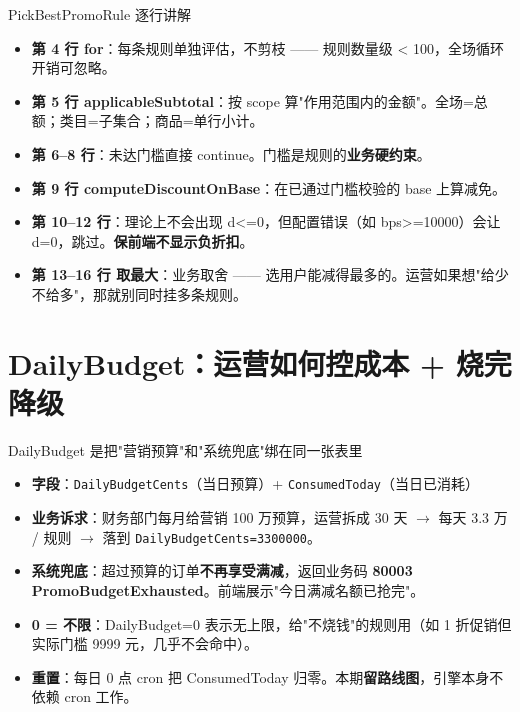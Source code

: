 \documentclass[aspectratio=169,11pt]{beamer}
\begin{document}
\begin{frame}[shrink]{PickBestPromoRule 逐行讲解}
\begin{itemize}
  \item \textbf{第 4 行 for}：每条规则单独评估，不剪枝 —— 规则数量级 < 100，全场循环开销可忽略。
  \item \textbf{第 5 行 applicableSubtotal}：按 scope 算"作用范围内的金额"。全场=总额；类目=子集合；商品=单行小计。
  \item \textbf{第 6--8 行}：未达门槛直接 continue。门槛是规则的\textbf{业务硬约束}。
  \item \textbf{第 9 行 computeDiscountOnBase}：在已通过门槛校验的 base 上算减免。
  \item \textbf{第 10--12 行}：理论上不会出现 d<=0，但配置错误（如 bps>=10000）会让 d=0，跳过。\textbf{保前端不显示负折扣}。
  \item \textbf{第 13--16 行 取最大}：业务取舍 —— 选用户能减得最多的。运营如果想"给少不给多"，那就别同时挂多条规则。
\end{itemize}
\end{frame}

\section{DailyBudget：运营如何控成本 + 烧完降级}

\begin{frame}[shrink]{DailyBudget 是把"营销预算"和"系统兜底"绑在同一张表里}
\begin{itemize}
  \item \textbf{字段}：\texttt{DailyBudgetCents}（当日预算）+ \texttt{ConsumedToday}（当日已消耗）
  \item \textbf{业务诉求}：财务部门每月给营销 100 万预算，运营拆成 30 天 $\to$ 每天 3.3 万 / 规则 $\to$ 落到 \texttt{DailyBudgetCents=3300000}。
  \item \textbf{系统兜底}：超过预算的订单\textbf{不再享受满减}，返回业务码 \textbf{80003 PromoBudgetExhausted}。前端展示"今日满减名额已抢完"。
  \item \textbf{0 = 不限}：DailyBudget=0 表示无上限，给"不烧钱"的规则用（如 1 折促销但实际门槛 9999 元，几乎不会命中）。
  \item \textbf{重置}：每日 0 点 cron 把 ConsumedToday 归零。本期\textbf{留路线图}，引擎本身不依赖 cron 工作。
\end{itemize}
\end{frame}
\end{document}
